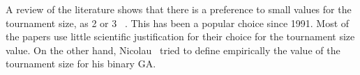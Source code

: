  A review of the literature shows that there is a preference to small values for the tournament size, as 2 or 3 ~\cite{goldberg1991real, goldberg1993toward, agrawal1995simulated, harik1999gambler, tsutsui1999multi, harik1999compact, deb2000efficient, beyer2001self,kaelo2007integrated, bhunia2009application,  nicolau2009application, sawyerr2011comparative, sawyerr2015benchmarking}. This has been a popular choice since 1991. Most of the papers use little scientific justification for their choice for the tournament size value. On the other hand, Nicolau~\cite{nicolau2009application} tried to define empirically the value of the tournament size for his binary GA.
 
 